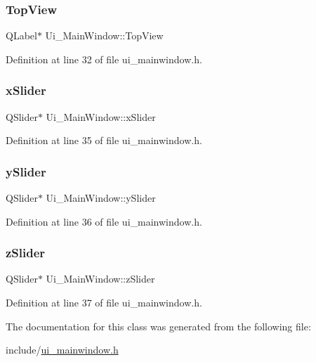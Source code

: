 \subsubsection{\texorpdfstring{Top\+View}{TopView}}
{\footnotesize\ttfamily Q\+Label$\ast$ Ui\+\_\+\+Main\+Window\+::\+Top\+View}



Definition at line 32 of file ui\+\_\+mainwindow.\+h.

\mbox{\label{class_ui___main_window_a55d1e4c09e7e91bd7af09c2c4c977014}} 
\subsubsection{\texorpdfstring{x\+Slider}{xSlider}}
{\footnotesize\ttfamily Q\+Slider$\ast$ Ui\+\_\+\+Main\+Window\+::x\+Slider}



Definition at line 35 of file ui\+\_\+mainwindow.\+h.

\mbox{\label{class_ui___main_window_ae74bb4b335829fb5f768c924a0037c6d}} 
\subsubsection{\texorpdfstring{y\+Slider}{ySlider}}
{\footnotesize\ttfamily Q\+Slider$\ast$ Ui\+\_\+\+Main\+Window\+::y\+Slider}



Definition at line 36 of file ui\+\_\+mainwindow.\+h.

\mbox{\label{class_ui___main_window_a90a5538b9dc26379fc236f7856f7cd02}} 
\subsubsection{\texorpdfstring{z\+Slider}{zSlider}}
{\footnotesize\ttfamily Q\+Slider$\ast$ Ui\+\_\+\+Main\+Window\+::z\+Slider}



Definition at line 37 of file ui\+\_\+mainwindow.\+h.



The documentation for this class was generated from the following file\+:\begin{DoxyCompactItemize}
\item 
include/\mbox{\hyperlink{ui__mainwindow_8h}{ui\+\_\+mainwindow.\+h}}\end{DoxyCompactItemize}
